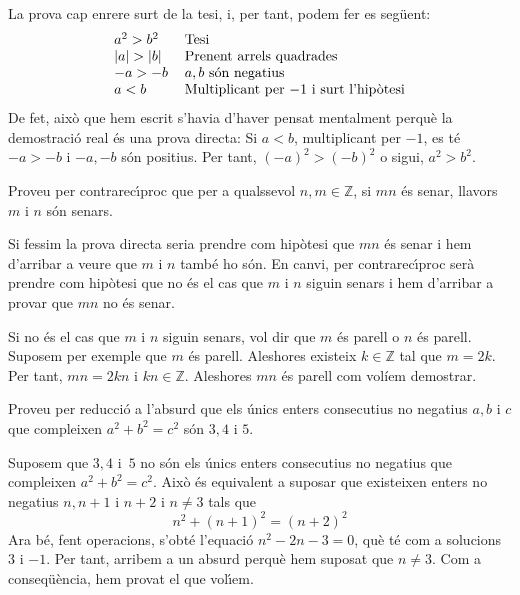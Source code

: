 \begin{solucio}
La prova cap enrere surt de la tesi, i, per tant, podem fer es seg\"{u}ent:%
\[%
\begin{tabular}
[c]{ll}%
$a^{2}>b^{2}$ & Tesi\\
$\left\vert a\right\vert >\left\vert b\right\vert $ & Prenent arrels
quadrades\\
$-a>-b$ & $a,b$ s\'{o}n negatius\\
$a<b$ & Multiplicant per $-1$ i surt l'hip\`{o}tesi
\end{tabular}
\]
De fet, aix\`{o} que hem escrit s'havia d'haver pensat mentalment perqu\`{e}
la demostraci\'{o} real \'{e}s una prova directa: Si $a<b$, multiplicant per
$-1$, es t\'{e} $-a>-b$ i $-a,-b$ s\'{o}n positius. Per tant, $\left(
-a\right)  ^{2}>(-b)^{2}$ o sigui, $a^{2}>b^{2}$.
\end{solucio}

\begin{exercici}
Proveu per contrarec\'{\i}proc que per a qualssevol $n,m\in\mathbb{Z}$, si
$mn$ \'{e}s senar, llavors $m$ i $n$ s\'{o}n senars.
\end{exercici}

\begin{solucio}
Si fessim la prova directa seria prendre com hip\`{o}tesi que $mn$ \'{e}s
senar i hem d'arribar a veure que $m$ i $n$ tamb\'{e} ho s\'{o}n. En canvi,
per contrarec\'{\i}proc ser\`{a} prendre com hip\`{o}tesi que no \'{e}s el cas
que $m$ i $n$ siguin senars i hem d'arribar a provar que $mn$ no \'{e}s senar.

Si no \'{e}s el cas que $m$ i $n$ siguin senars, vol dir que $m$ \'{e}s parell
o $n$ \'{e}s parell. Suposem per exemple que $m$ \'{e}s parell. Aleshores
existeix $k\in\mathbb{Z}$ tal que $m=2k$. Per tant, $mn=2kn$ i $kn\in
\mathbb{Z}$. Aleshores $mn$ \'{e}s parell com volíem demostrar.
\end{solucio}

\begin{exercici}
Proveu per reducci\'{o} a l'absurd que els \'{u}nics enters consecutius no
negatius $a,b$ i $c$ que compleixen $a^{2}+b^{2}=c^{2}$ s\'{o}n $3,4$ i $5$.
\end{exercici}

\begin{solucio}
Suposem que $3,4$ i~$5$ no s\'{o}n els \'{u}nics enters consecutius no
negatius que compleixen $a^{2}+b^{2}=c^{2}$. Aix\`{o} \'{e}s equivalent a
suposar que existeixen enters no negatius $n,n+1$ i $n+2$ i $n\neq3$ tals que%
\[
n^{2}+(n+1)^{2}=(n+2)^{2}%
\]
Ara b\'{e}, fent operacions, s'obt\'{e} l'equaci\'{o} $n^{2}-2n-3=0$, qu\`{e}
t\'{e} com a solucions $3$ i $-1$. Per tant, arribem a un absurd perqu\`{e}
hem suposat que $n\neq3$. Com a conseq\"{u}\`{e}ncia, hem provat el que vol\'{\i}em.
\end{solucio}

